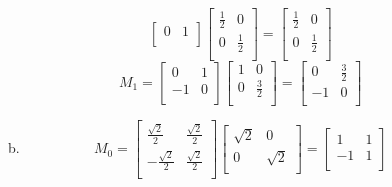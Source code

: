 \documentclass[11pt, oneside]{article}
\begin{document}
\begin{enumerate}[Problem 1:]
\begin{enumerate}[1.]
\begin{enumerate}[a)]
\[\begin{bmatrix}
                0 & 1\\
              \end{bmatrix}
              \begin{bmatrix}
                \frac 1 2 & 0\\
                0 & \frac 1 2\\
              \end{bmatrix}
              =
              \begin{bmatrix}
                \frac 1 2 & 0\\
                0 & \frac 1 2\\
              \end{bmatrix}
            \]
            \[
              M_1 = 
              \begin{bmatrix}
                0 & 1\\
                -1 & 0\\
              \end{bmatrix}
              \begin{bmatrix}
                1 & 0\\
                0 & \frac 3 2\\
              \end{bmatrix}
              =
              \begin{bmatrix}
                0 & \frac 3 2\\
                -1 & 0\\
              \end{bmatrix}
            \]
          \item
            \[
              M_0 = 
              \begin{bmatrix}
                \frac {\sqrt 2} 2 & \frac {\sqrt 2} 2\\
                -\frac {\sqrt 2} 2 & \frac {\sqrt 2} 2\\
              \end{bmatrix}
              \begin{bmatrix}
                \sqrt 2 & 0\\
                0 & \sqrt 2\\
              \end{bmatrix}
              =
              \begin{bmatrix}
                1 & 1\\
                -1 & 1\\
              \end{bmatrix}
            \]

\end{enumerate}
\end{enumerate}
\end{enumerate}
\end{document}
